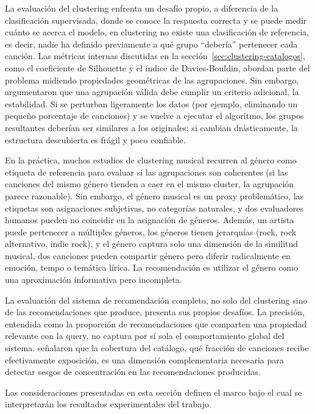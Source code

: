 La evaluación del clustering enfrenta un desafío propio, a diferencia de la clasificación supervisada, donde se conoce la respuesta correcta y se puede medir cuánto se acerca el modelo, en clustering no existe una clasificación de referencia, es decir, nadie ha definido previamente a qué grupo ``debería'' pertenecer cada canción. Las métricas internas discutidas en la sección~\ref{sec:clustering-catalogos}, como el coeficiente de Silhouette y el índice de Davies-Bouldin, abordan parte del problema midiendo propiedades geométricas de las agrupaciones. Sin embargo, \textcite{liu_2022_stability} argumentaron que una agrupación válida debe cumplir un criterio adicional, la estabilidad. Si se perturban ligeramente los datos (por ejemplo, eliminando un pequeño porcentaje de canciones) y se vuelve a ejecutar el algoritmo, los grupos resultantes deberían ser similares a los originales; si cambian drásticamente, la estructura descubierta es frágil y poco confiable.

En la práctica, muchos estudios de clustering musical recurren al género como etiqueta de referencia para evaluar si las agrupaciones son coherentes (si las canciones del mismo género tienden a caer en el mismo cluster, la agrupación parece razonable). Sin embargo, el género musical es un proxy problemático, las etiquetas son asignaciones subjetivas, no categorías naturales, y dos evaluadores humanos pueden no coincidir en la asignación de géneros. Además, un artista puede pertenecer a múltiples géneros, los géneros tienen jerarquías (rock, rock alternativo, indie rock), y el género captura solo una dimensión de la similitud musical, dos canciones pueden compartir género pero diferir radicalmente en emoción, tempo o temática lírica. La recomendación es utilizar el género como una aproximación informativa pero incompleta.

La evaluación del sistema de recomendación completo, no solo del clustering sino de las recomendaciones que produce, presenta sus propios desafíos. La precisión, entendida como la proporción de recomendaciones que comparten una propiedad relevante con la query, no captura por sí sola el comportamiento global del sistema. \textcite{kaminskas_2016_beyond} señalaron que la cobertura del catálogo, qué fracción de canciones recibe efectivamente exposición, es una dimensión complementaria necesaria para detectar sesgos de concentración en las recomendaciones producidas.

Las consideraciones presentadas en esta sección definen el marco bajo el cual se interpretarán los resultados experimentales del trabajo.
